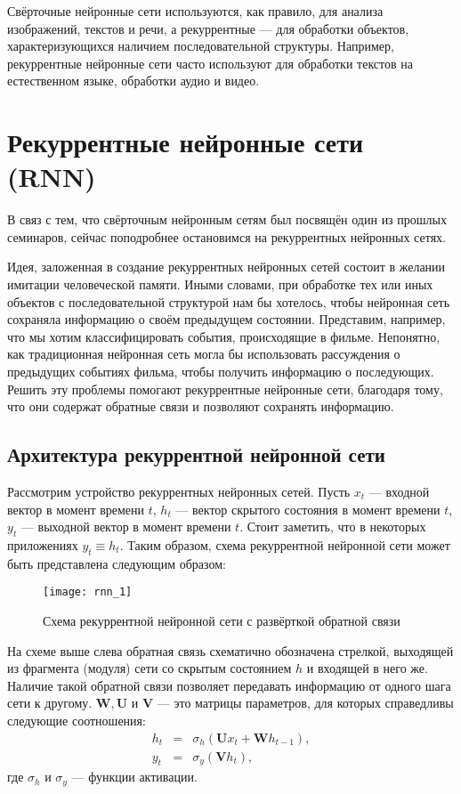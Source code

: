 \documentclass[specialist,
               substylefile = spbu.rtx,
               subf, 
               colorlinks=true, 12pt]{disser}
\begin{document}
Свёрточные нейронные сети используются, как правило, для анализа изображений, текстов и речи, а рекуррентные --- для обработки объектов, характеризующихся наличием последовательной структуры. Например, рекуррентные нейронные сети часто используют для обработки текстов на естественном языке, обработки аудио и видео.

\section{Рекуррентные нейронные сети (RNN)}

В связ с тем, что свёрточным нейронным сетям был посвящён один из прошлых семинаров, сейчас поподробнее остановимся на рекуррентных нейронных сетях. 


Идея, заложенная в создание рекуррентных нейронных сетей состоит в желании имитации человеческой памяти. Иными словами, при обработке тех или иных объектов с последовательной структурой нам бы хотелось, чтобы нейронная сеть сохраняла информацию о своём предыдущем состоянии. Представим, например, что мы хотим классифицировать события, происходящие в фильме. Непонятно, как традиционная нейронная сеть могла бы использовать рассуждения о предыдущих событиях фильма, чтобы получить информацию о последующих. Решить эту проблемы помогают рекуррентные нейронные сети, благодаря тому, что они содержат обратные связи и позволяют сохранять информацию.

\subsection{Архитектура рекуррентной нейронной сети}

Рассмотрим устройство рекуррентных нейронных сетей. Пусть $x_t$ --- входной вектор в момент времени $t$, $h_t$ --- вектор скрытого состояния в момент времени $t$, $y_t$ --- выходной вектор в момент времени $t$. Стоит заметить, что  в некоторых приложениях $y_t \equiv h_t$. Таким образом, схема  рекуррентной нейронной сети может быть представлена следующим образом:

\begin{figure}[!h]
\begin{center}
\texttt{[image: rnn\_1]}
\end{center}
\caption{Схема рекуррентной нейронной сети с развёрткой обратной связи}
\end{figure}

На схеме выше слева обратная связь схематично обозначена стрелкой, выходящей из фрагмента (модуля)  сети со скрытым состоянием $h$ и входящей в  него же. Наличие такой обратной связи позволяет передавать информацию от одного шага сети к другому. $\mathbf{W}, \mathbf{U}$ и $\mathbf{V}$ --- это матрицы параметров, для которых справедливы следующие соотношения:
\begin{eqnarray*}
h_t &=& \sigma_h(\mathbf{U}x_t + \mathbf{W}h_{t-1}), \\
y_t &=& \sigma_y(\mathbf{V}h_t),
\end{eqnarray*}
где $\sigma_h$ и $\sigma_y$ --- функции активации.
\end{document}
